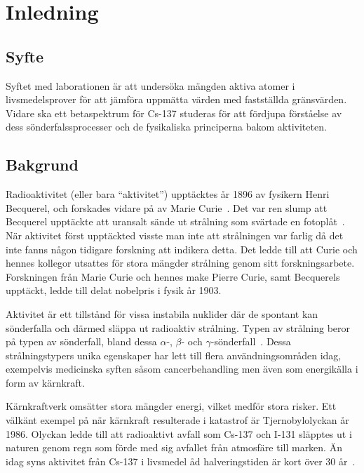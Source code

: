 \section{Inledning} \label{sec:introduction}

\subsection{Syfte} \label{sec:purpose}

Syftet med laborationen är att undersöka mängden aktiva atomer i
livsmedelsprover för att jämföra uppmätta värden med fastställda gränsvärden.
Vidare ska ett betaspektrum för Cs-137 studeras för att fördjupa förståelse
av dess sönderfalssprocesser och de fysikaliska principerna bakom aktiviteten.

\subsection{Bakgrund} \label{sec:background}

Radioaktivitet (eller bara ``aktivitet'') upptäcktes år 1896 av fysikern
Henri Becquerel, och forskades vidare på av Marie Curie~\parencite{curie}. Det
var ren slump att Becquerel upptäckte att uransalt sände ut strålning som
svärtade en fotoplåt~\parencite{milestones}. När aktivitet först upptäckted
visste man inte att strålningen var farlig då det inte fanns någon tidigare
forskning att indikera detta. Det ledde till att Curie och hennes kollegor
utsattes för stora mängder strålning genom sitt forskningsarbete. Forskningen
från Marie Curie och hennes make Pierre Curie, samt Becquerels upptäckt, ledde
till delat nobelpris i fysik år 1903.

Aktivitet är ett tillstånd för vissa instabila nuklider där de spontant kan
sönderfalla och därmed släppa ut radioaktiv strålning. Typen av strålning beror
på typen av sönderfall, bland dessa $\alpha$-, $\beta$- och
$\gamma$-sönderfall~\parencite{arpansa}. Dessa strålningstypers unika
egenskaper har lett till flera användningsområden idag, exempelvis medicinska
syften såsom cancerbehandling men även som energikälla i form av kärnkraft.

Kärnkraftverk omsätter stora mängder energi, vilket medför stora risker. Ett
välkänt exempel på när kärnkraft resulterade i katastrof är Tjernobylolyckan år
1986. Olyckan ledde till att radioaktivt avfall som Cs-137 och I-131 släpptes
ut i naturen genom regn som förde med sig avfallet från atmosfäre till marken.
Än idag syns aktivitet från Cs-137 i livsmedel åd halveringstiden är kort
över 30 år~\parencite{fysika}.

